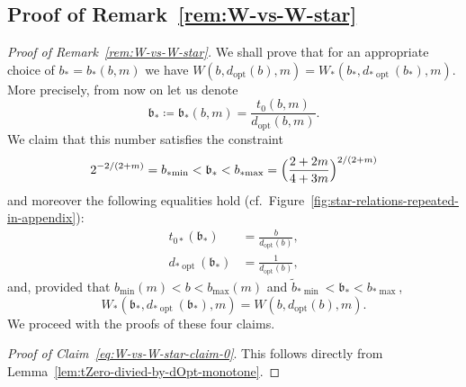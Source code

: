 \documentclass[a4paper]{amsart} %
\theoremstyle{definition}
\theoremstyle{remark}
\numberwithin{equation}{section}
\newcommand*{\bStar}{b_*}
\newcommand*{\tZeroStar}{t_{0*}}
\newcommand*{\XXXspecialbd}{W}
\newcommand*{\XXXspecialbdStar}{W_*}
\newcommand*{\bMin}{b_{\min}}
\newcommand*{\bMax}{b_{\max}}
\newcommand*{\dOpt}{d_{\mathrm{opt}}}
\newcommand*{\bMinStar}{b_{*\!\min}}
\newcommand*{\bMaxStar}{b_{*\!\max}}
\newcommand*{\dOptStar}{d_{*\!\operatorname{opt}}}
\newcommand*{\bMinTildeStar}{\widetilde{b}_{*\!\min}}
\newcommand*{\bStarWvsWStar}{\mathfrak{b}_*}
\begin{document}
\subsection{Proof of Remark~\ref{rem:W-vs-W-star}}



\begin{proof}[Proof of Remark~\ref{rem:W-vs-W-star}]	
	We shall prove that for an appropriate choice of $\bStar=\bStar(b,m)$
	we have $\XXXspecialbd(b,\dOpt(b),m) = \XXXspecialbdStar(\bStar,\dOptStar(\bStar),m)$.
	More precisely, from now on let us denote 
	\[
	\bStarWvsWStar \coloneqq \bStarWvsWStar (b,m) =  \frac{t_0(b,m)}{\dOpt(b,m)}.
	\]
	We claim that this number satisfies the constraint
	\begin{equation}
	\label{eq:W-vs-W-star-claim-0}
	2^{-2/(2+m)} = \bMinStar < \bStarWvsWStar  < \bMaxStar = \Bigl(\frac{2+2m}{4+3m}\Bigr)^{2/(2+m)}
	\end{equation}
	and moreover the following  equalities hold (cf.\ Figure~\ref{fig:star-relations-repeated-in-appendix}):
	\begin{align}
	\label{eq:W-vs-W-star-claim-1}
	\tZeroStar(\bStarWvsWStar) %
	&= \frac{b}{\dOpt(b)},\\
	\label{eq:W-vs-W-star-claim-2}
	\dOptStar(\bStarWvsWStar) %
	&= \frac{1}{\dOpt(b)},
	\end{align}
	and, provided that $\bMin(m) < b < \bMax(m)$ and $\bMinTildeStar < \bStarWvsWStar < \bMaxStar$,
	\begin{equation}
	\label{eq:W-vs-W-star-claim-3}	    
	\XXXspecialbdStar(\bStarWvsWStar, \dOptStar(\bStarWvsWStar), m) 
	= 	\XXXspecialbd(b,\dOpt(b),m).
	\end{equation}
	We proceed with the proofs of these four claims. 
	
	\emph{Proof of Claim~\eqref{eq:W-vs-W-star-claim-0}}.
	This follows directly from Lemma~\ref{lem:tZero-divied-by-dOpt-monotone}. 
	

\end{proof}
\end{document}
